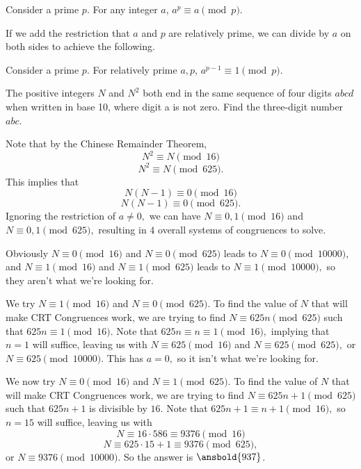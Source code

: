 \documentclass[mast]{lucky}
\begin{document}
\begin{theo}
Consider a prime $p.$ For any integer $a$, $a^{p}\equiv a \pmod {p}.$
\end{theo}

If we add the restriction that $a$ and $p$ are relatively prime, we can divide by $a$ on both sides to achieve the following.

\begin{theo}
Consider a prime $p.$ For relatively prime $a, p$, $a^{p-1}\equiv 1 \pmod {p}.$
\end{theo}

\begin{exam}[AIME I 2014/8]
The positive integers $N$ and $N^2$ both end in the same sequence of four digits $abcd$ when written in base 10, where digit a is not zero. Find the three-digit number $abc$.
\end{exam}
\begin{sol}
Note that by the Chinese Remainder Theorem,
\[N^2\equiv N\pmod {16}\]
\[N^2\equiv N\pmod{625}.\]
This implies that
\[N(N-1)\equiv 0\pmod{16}\]
\[N(N-1)\equiv 0\pmod{625}.\]
Ignoring the restriction of $a\neq 0,$ we can have $N\equiv 0,1\pmod{16}$ and $N\equiv 0,1\pmod{625},$ resulting in $4$ overall systems of congruences to solve.

Obviously $N\equiv 0\pmod{16}$ and $N\equiv 0\pmod{625}$ leads to $N\equiv 0\pmod{10000},$ and $N\equiv 1\pmod{16}$ and $N\equiv 1\pmod{625}$ leads to $N\equiv 1\pmod{10000},$ so they aren't what we're looking for.

We try $N\equiv 1\pmod{16}$ and $N\equiv 0\pmod{625}.$ To find the value of $N$ that will make CRT Congruences work, we are trying to find $N\equiv 625n\pmod{625}$ such that $625n\equiv 1\pmod{16}.$ Note that $625n\equiv n\equiv 1\pmod{16},$ implying that $n=1$ will suffice, leaving us with $N\equiv 625\pmod{16}$ and $N\equiv 625\pmod{625},$ or $N\equiv 625\pmod{10000}.$ This has $a=0,$ so it isn't what we're looking for.

We now try $N\equiv 0\pmod{16}$ and $N\equiv 1\pmod{625}.$ To find the value of $N$ that will make CRT Congruences work, we are trying to find $N\equiv 625n+1\pmod{625}$ such that $625n+1$ is divisible by $16.$ Note that $625n+1\equiv n+1\pmod{16},$ so $n=15$ will suffice, leaving us with
\[N\equiv 16\cdot 586\equiv 9376\pmod{16}\]
\[N\equiv 625\cdot 15+1\equiv 9376\pmod{625},\]
or $N\equiv 9376\pmod{10000}.$ So the answer is $\ansbold{937}$.
\end{sol}
\end{document}
